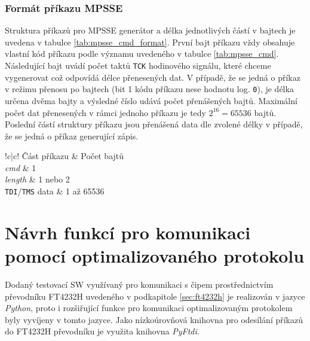 \subsubsection{Formát příkazu \acs{MPSSE}}
Struktura příkazů pro \acs{MPSSE} generátor a délka jednotlivých částí v bajtech je uvedena v tabulce \ref{tab:mpsse_cmd_format}. První bajt příkazu vždy obsahuje vlastní kód příkazu podle významu uvedeného v tabulce \ref{tab:mpsse_cmd}. Následující bajt uvádí počet taktů \texttt{\acs{TCK}} hodinového signálu, které chceme vygenerovat což odpovídá délce přenesených dat. V případě, že se jedná o příkaz v režimu přenosu po bajtech (bit 1 kódu příkazu nese hodnotu log. \texttt{0}), je délka určena dvěma bajty a výsledné číslo udává počet přenášených bajtů. Maximální počet dat přenesených v rámci jednoho příkazu je tedy \(2^{16} = 65536\) bajtů. Poslední částí struktury příkazu jsou přenášená data dle zvolené délky v případě, že se jedná o příkaz generující zápis.

\begin{table}[!h]
  \caption{Formát příkazů \acs{MPSSE} \cite{MPSSE_cmd}}
  \begin{center}
  	\small
	  \begin{tabular}{!{\vrule width 1.2pt}c|c!{\vrule width 1.2pt}}
	    Část příkazu & Počet bajtů\\
			\textit{cmd} & 1\\
			\hline
			\textit{length} & 1 nebo 2\\
			\hline
			\texttt{\acs{TDI}}/\texttt{\acs{TMS}} data & 1 až 65536\\
			\hline
		\end{tabular}
  \end{center}
	\label{tab:mpsse_cmd_format}
\end{table}

\section{Návrh funkcí pro komunikaci pomocí optimalizovaného protokolu}
Dodaný testovací SW využívaný pro komunikaci s čipem prostřednictvím převodníku FT4232H uvedeného v podkapitole \ref{sec:ft4232h} je realizován v jazyce \textit{Python}, proto i rozšiřující funkce pro komunikaci optimalizovaným protokolem byly vyvíjeny v tomto jazyce. Jako nízkoúrovňová knihovna pro odesílání příkazů do FT4232H převodníku je využita knihovna \textit{PyFtdi}.	\cite{PyFtdi} \cite{PyFtdi_doc}


